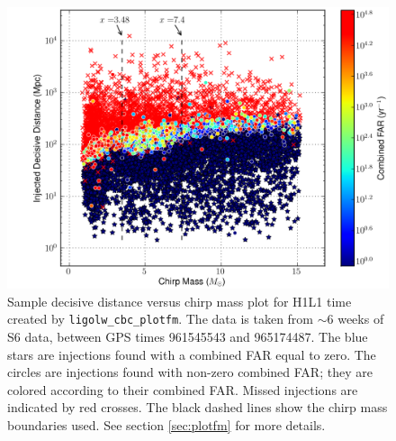 \begin{figure}[p]
\label{fig:plotfm-dist_v_mchirp}
\center
\includegraphics[width=6in]{figures/H1L1-ligolw_cbc_plotfm_fm_dist_v_param_ALLINJ_CAT_4_VETO_F1_ALLINJ_PLOTTED-956707143-4838544.png}
\caption{Sample decisive distance versus chirp mass plot for H1L1 time created
by \texttt{ligolw\_cbc\_plotfm}. The data is taken from $\sim6$ weeks of
\ac{S6} data, between GPS times 961545543 and 965174487. The blue stars are
injections found with a combined FAR equal to zero. The circles are
injections found with non-zero combined FAR; they are colored according to
their combined FAR. Missed injections are indicated by red crosses. The
black dashed lines show the chirp mass boundaries used. See section
\ref{sec:plotfm} for more details.}
\end{figure}


